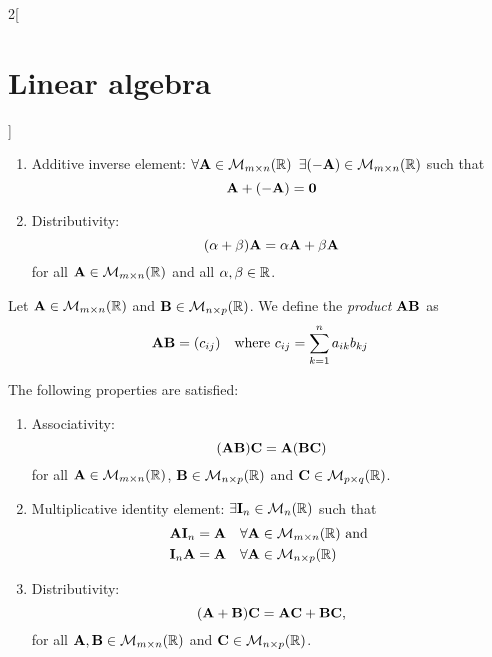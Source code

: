 \documentclass[../../../main.tex]{subfiles}
\begin{document}
\begin{multicols}{2}[\section{Linear algebra}]
\begin{prop}
\begin{enumerate}
            \item Additive inverse element: $\forall\boldsymbol{\mathrm{A}}\in\mathcal{M}_{m\times n}(\mathbb{R})$ $\exists(-\boldsymbol{\mathrm{A}})\in\mathcal{M}_{m\times n}(\mathbb{R})$ such that $$\boldsymbol{\mathrm{A}}+(-\boldsymbol{\mathrm{A}})=\boldsymbol{\mathrm{0}}$$
            \item Distributivity: $$(\alpha+\beta)\boldsymbol{\mathrm{A}}=\alpha\boldsymbol{\mathrm{A}}+\beta\boldsymbol{\mathrm{A}}$$ for all $\boldsymbol{\mathrm{A}}\in\mathcal{M}_{m\times n}(\mathbb{R})$ and all $\alpha,\beta\in\mathbb{R}$.
        \end{enumerate}
    \end{prop}
    \begin{definition}
        Let $\boldsymbol{\mathrm{A}}\in\mathcal{M}_{m\times n}(\mathbb{R})$ and $\boldsymbol{\mathrm{B}}\in\mathcal{M}_{n\times p}(\mathbb{R})$. We define the \textit{product $\boldsymbol{\mathrm{A}}\boldsymbol{\mathrm{B}}$} as $$\boldsymbol{\mathrm{A}}\boldsymbol{\mathrm{B}}=(c_{ij})\quad\text{where }c_{ij}=\sum_{k=1}^na_{ik}b_{kj}$$
    \end{definition}
    \begin{prop}
        The following properties are satisfied:
        \begin{enumerate}
            \item Associativity: $$(\boldsymbol{\mathrm{A}}\boldsymbol{\mathrm{B}})\boldsymbol{\mathrm{C}}=\boldsymbol{\mathrm{A}}(\boldsymbol{\mathrm{B}}\boldsymbol{\mathrm{C}})$$ for all $\boldsymbol{\mathrm{A}}\in\mathcal{M}_{m\times n}(\mathbb{R})$, $\boldsymbol{\mathrm{B}}\in\mathcal{M}_{n\times p}(\mathbb{R})$ and $\boldsymbol{\mathrm{C}}\in\mathcal{M}_{p\times q}(\mathbb{R})$.
            \item Multiplicative identity element: $\exists\boldsymbol{\mathrm{I}}_n\in\mathcal{M}_n(\mathbb{R})$ such that
                  \begin{align*}
                       & \boldsymbol{\mathrm{A}}\boldsymbol{\mathrm{I}}_n=\boldsymbol{\mathrm{A}}\quad\forall\boldsymbol{\mathrm{A}}\in\mathcal{M}_{m\times n}(\mathbb{R})\text{ and } \\
                       & \boldsymbol{\mathrm{I}}_n\boldsymbol{\mathrm{A}}=\boldsymbol{\mathrm{A}}\quad\forall\boldsymbol{\mathrm{A}}\in\mathcal{M}_{n\times p}(\mathbb{R})
                  \end{align*}
            \item Distributivity: $$(\boldsymbol{\mathrm{A}}+\boldsymbol{\mathrm{B}})\boldsymbol{\mathrm{C}}=\boldsymbol{\mathrm{A}}\boldsymbol{\mathrm{C}}+\boldsymbol{\mathrm{B}}\boldsymbol{\mathrm{C}},$$ for all $\boldsymbol{\mathrm{A}},\boldsymbol{\mathrm{B}}\in\mathcal{M}_{m\times n}(\mathbb{R})$ and $\boldsymbol{\mathrm{C}}\in\mathcal{M}_{n\times p}(\mathbb{R})$.

\end{enumerate}
\end{prop}
\end{multicols}
\end{document}

